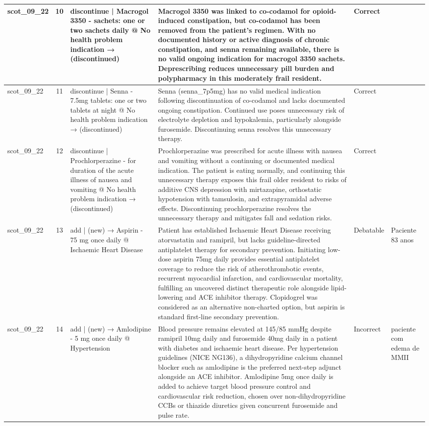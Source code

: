 \begin{longtable}{|p{1.45cm}|c|p{3.3cm}|p{6.5cm}|p{1.55cm}|p{2.3cm}|}
\hline
scot\_09\_22 & 10 & discontinue | Macrogol 3350 - sachets: one or two sachets daily @ No health problem indication → (discontinued) & Macrogol 3350 was linked to co-codamol for opioid-induced constipation, but co-codamol has been removed from the patient's regimen. With no documented history or active diagnosis of chronic constipation, and senna remaining available, there is no valid ongoing indication for macrogol 3350 sachets. Deprescribing reduces unnecessary pill burden and polypharmacy in this moderately frail resident. & Correct &  \\
\hline
scot\_09\_22 & 11 & discontinue | Senna - 7.5mg tablets: one or two tablets at night @ No health problem indication → (discontinued) & Senna (senna\_7p5mg) has no valid medical indication following discontinuation of co-codamol and lacks documented ongoing constipation. Continued use poses unnecessary risk of electrolyte depletion and hypokalemia, particularly alongside furosemide. Discontinuing senna resolves this unnecessary therapy. & Correct &  \\
\hline
scot\_09\_22 & 12 & discontinue | Prochlorperazine - for duration of the acute illness of nausea and vomiting @ No health problem indication → (discontinued) & Prochlorperazine was prescribed for acute illness with nausea and vomiting without a continuing or documented medical indication. The patient is eating normally, and continuing this unnecessary therapy exposes this frail older resident to risks of additive CNS depression with mirtazapine, orthostatic hypotension with tamsulosin, and extrapyramidal adverse effects. Discontinuing prochlorperazine resolves the unnecessary therapy and mitigates fall and sedation risks. & Correct &  \\
\hline
scot\_09\_22 & 13 & add | (new) → Aspirin - 75 mg once daily @ Ischaemic Heart Disease & Patient has established Ischaemic Heart Disease receiving atorvastatin and ramipril, but lacks guideline-directed antiplatelet therapy for secondary prevention. Initiating low-dose aspirin 75mg daily provides essential antiplatelet coverage to reduce the risk of atherothrombotic events, recurrent myocardial infarction, and cardiovascular mortality, fulfilling an uncovered distinct therapeutic role alongside lipid-lowering and ACE inhibitor therapy. Clopidogrel was considered as an alternative non-charted option, but aspirin is standard first-line secondary prevention. & Debatable & Paciente 83 anos \\
\hline
scot\_09\_22 & 14 & add | (new) → Amlodipine - 5 mg once daily @ Hypertension & Blood pressure remains elevated at 145/85 mmHg despite ramipril 10mg daily and furosemide 40mg daily in a patient with diabetes and ischaemic heart disease. Per hypertension guidelines (NICE NG136), a dihydropyridine calcium channel blocker such as amlodipine is the preferred next-step adjunct alongside an ACE inhibitor. Amlodipine 5mg once daily is added to achieve target blood pressure control and cardiovascular risk reduction, chosen over non-dihydropyridine CCBs or thiazide diuretics given concurrent furosemide and pulse rate. & Incorrect & paciente com edema de MMII \\

\end{longtable}
